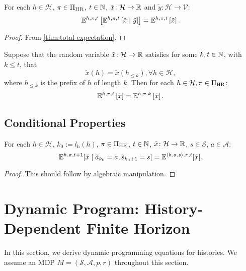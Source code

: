 \begin{theorem} \label{thm:total-expectation-h}
  For each $h\in \mathcal{H}$, $\pi\in \Pi_{\mathrm{HR}}$, $t\in \mathbb{N}$, $\tilde{x}\colon \mathcal{H} \to \mathbb{R}$ and $\tilde{y}\colon \mathcal{H} \to \mathcal{V}$:
  \[
    \mathbb{E}^{h, \pi, t} \left[ \mathbb{E}^{h, \pi, t} \left[  \tilde{x} \mid  \tilde{y} \right] \right]
    =
    \mathbb{E}^{h, \pi, t} \left[ \tilde{x} \right].
  \]
\end{theorem}
\begin{proof}
From \cref{thm:total-expectation}.
\end{proof}

\begin{theorem}\label{thm:exp-horizon-cut}
Suppose that the random variable $\tilde{x}\colon \mathcal{H} \to \mathbb{R}$ satisfies for some $k, t \in \mathbb{N}$, with $k \le t$, that
  \[
   \tilde{x}(h) = \tilde{x}(h_{\le k}) , \forall h\in  \mathcal{H},
 \]
 where $h_{\le k}$ is the prefix of $h$ of length $k$. Then for each $h\in \mathcal{H}, \pi\in \Pi_{\mathrm{HR}}$:
 \[
  \mathbb{E}^{h,\pi,t} \left[ \tilde{x} \right]  = \mathbb{E}^{h,\pi,k} \left[  \tilde{x} \right].
 \]
\end{theorem}


\subsection{Conditional Properties}

\begin{theorem} \label{thm:exph-cond-eq-hist}
For each $h\in \mathcal{H}$, $k_0 := l_{\mathrm{h}}(h)$, $\pi\in \Pi_{\mathrm{HR}}$, $t\in \mathbb{N}$, $\tilde{x}\colon \mathcal{H} \to \mathbb{R}$, $s\in \mathcal{S}$, $a\in \mathcal{A}$:
\[
  \mathbb{E}^{h,\pi,t+1}[\tilde{x} \mid \tilde{a}_{k_0} = a, \tilde{s}_{k_0+1} = s]
  =
  \mathbb{E}^{\langle h, a, s\rangle,\pi,t}[\tilde{x}].
\]
\end{theorem}
\begin{proof}
This should follow by algebraic manipulation.
\end{proof}

\section{Dynamic Program: History-Dependent Finite Horizon}

In this section, we derive dynamic programming equations for histories. We assume an MDP $M = (\mathcal{S}, \mathcal{A}, p, r)$ throughout this section.

